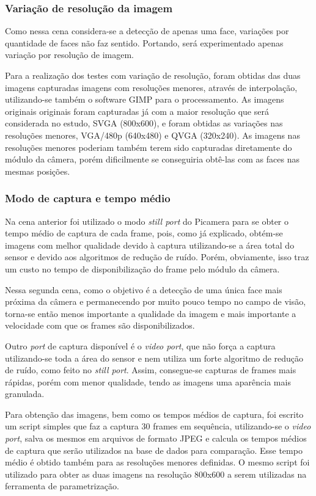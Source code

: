\subsubsection{Variação de resolução da imagem}

Como nessa cena considera-se a detecção de apenas uma face, variações por quantidade de faces não faz sentido. Portando, será experimentado apenas variação por resolução de imagem. 

Para a realização dos testes com variação de resolução, foram obtidas das duas imagens capturadas imagens com resoluções menores, através de interpolação, utilizando-se também o software GIMP para o processamento. As imagens originais originais foram capturadas já com a maior resolução que será considerada no estudo, SVGA (800x600), e foram obtidas as variações nas resoluções menores, VGA/480p (640x480) e QVGA (320x240). As imagens nas resoluções menores poderiam também terem sido capturadas diretamente do módulo da câmera, porém dificilmente se conseguiria obtê-las com as faces nas mesmas posições.

\subsubsection{Modo de captura e tempo médio}

Na cena anterior foi utilizado o modo \emph{still port} do Picamera para se obter o tempo médio de captura de cada frame, pois, como já explicado, obtém-se imagens com melhor qualidade devido à captura utilizando-se a área total do sensor e devido aos algoritmos de redução de ruído. Porém, obviamente, isso traz um custo no tempo de disponibilização do frame pelo módulo da câmera.

Nessa segunda cena, como o objetivo é a detecção de uma única face mais próxima da câmera e permanecendo por muito pouco tempo no campo de visão, torna-se então menos importante a qualidade da imagem e mais importante a velocidade com que os frames são disponibilizados.

Outro \emph{port} de captura disponível é o \emph{video port}, que não força a captura utilizando-se toda a área do sensor e nem utiliza um forte algoritmo de redução de ruído, como feito no \emph{still port}. Assim, consegue-se capturas de frames mais rápidas, porém com menor qualidade, tendo as imagens uma aparência mais granulada. 

Para obtenção das imagens, bem como os tempos médios de captura, foi escrito um script simples que faz a captura 30 frames em sequência, utilizando-se o \emph{video port}, salva os mesmos em arquivos de formato JPEG e calcula os tempos médios de captura que serão utilizados na base de dados para comparação. Esse tempo médio é obtido também para as resoluções menores definidas. O mesmo script foi utilizado para obter as duas imagens na resolução 800x600 a serem utilizadas na ferramenta de parametrização. 


